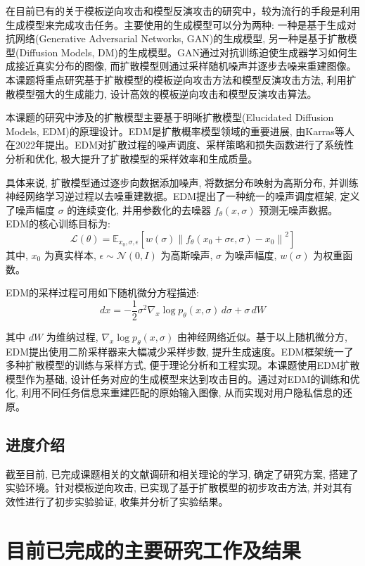 
在目前已有的关于模板逆向攻击和模型反演攻击的研究中，较为流行的手段是利用生成模型来完成攻击任务。主要使用的生成模型可以分为两种: 一种是基于生成对抗网络(Generative Adversarial Networks, GAN)的生成模型, 另一种是基于扩散模型(Diffusion Models, DM)的生成模型。GAN通过对抗训练迫使生成器学习如何生成接近真实分布的图像, 而扩散模型则通过采样随机噪声并逐步去噪来重建图像。本课题将重点研究基于扩散模型的模板逆向攻击方法和模型反演攻击方法, 利用扩散模型强大的生成能力, 设计高效的模板逆向攻击和模型反演攻击算法。

本课题的研究中涉及的扩散模型主要基于明晰扩散模型(Elucidated Diffusion Models, EDM)的原理设计。EDM是扩散概率模型领域的重要进展, 由Karras等人在2022年提出。EDM对扩散过程的噪声调度、采样策略和损失函数进行了系统性分析和优化, 极大提升了扩散模型的采样效率和生成质量。

具体来说, 扩散模型通过逐步向数据添加噪声, 将数据分布映射为高斯分布, 并训练神经网络学习逆过程以去噪重建数据。EDM提出了一种统一的噪声调度框架, 定义了噪声幅度 $\sigma$ 的连续变化, 并用参数化的去噪器 $f_\theta(x, \sigma)$ 预测无噪声数据。EDM的核心训练目标为:
\[
  \mathcal{L}(\theta) = \mathbb{E}_{x_0, \sigma, \epsilon} \left[ w(\sigma) \left\| f_\theta(x_0 + \sigma \epsilon, \sigma) - x_0 \right\|^2 \right]
\]
其中, $x_0$ 为真实样本, $\epsilon \sim \mathcal{N}(0, I)$ 为高斯噪声, $\sigma$ 为噪声幅度, $w(\sigma)$ 为权重函数。


EDM的采样过程可用如下随机微分方程描述:
\[
  dx = -\frac{1}{2} \sigma^2 \nabla_x \log p_\theta(x, \sigma) \, d\sigma + \sigma \, dW
\]

其中 $dW$ 为维纳过程, $\nabla_x \log p_\theta(x, \sigma)$ 由神经网络近似。基于以上随机微分方, EDM提出使用二阶采样器来大幅减少采样步数, 提升生成速度。EDM框架统一了多种扩散模型的训练与采样方式, 便于理论分析和工程实现。本课题使用EDM扩散模型作为基础, 设计任务对应的生成模型来达到攻击目的。通过对EDM的训练和优化, 利用不同任务信息来重建匹配的原始输入图像, 从而实现对用户隐私信息的还原。

\subsection{进度介绍}
截至目前, 已完成课题相关的文献调研和相关理论的学习, 确定了研究方案, 搭建了实验环境。针对模板逆向攻击, 已实现了基于扩散模型的初步攻击方法, 并对其有效性进行了初步实验验证, 收集并分析了实验结果。

\section{目前已完成的主要研究工作及结果}

